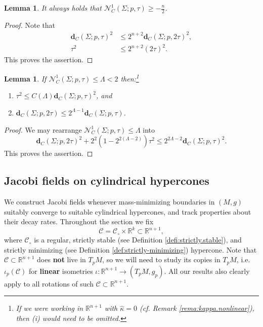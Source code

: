 \documentclass[11pt, letterpaper, reqno]{amsart}
\numberwithin{equation}{section}
\newtheorem{Lem}[Def]{Lemma}
\theoremstyle{remark}
\newcommand{\RR}{\mathbb{R}}
\newcommand{\cC}{\mathcal{C}}
\newcommand{\cN}{\mathcal{N}}
\newcommand{\mbfd}{\mathbf{d}}
\begin{document}
\begin{Lem}\label{Lem:freq-bd-below}
It always holds that $\cN^{1}_{C}(\Sigma;p,\tau) \geq - \frac n 2$. 
\end{Lem}
\begin{proof}
Note that
\begin{align*}
	\mbfd_C(\Sigma;p,\tau)^2 & \leq 2^{n+2} \mbfd_C(\Sigma;p,2\tau)^2, \\
	\tau^2 & \leq 2^{n+2}(2\tau)^2.
\end{align*}
This proves the assertion. 
\end{proof} 

\begin{Lem}\label{Lem:freq-lss-2-metric-dies}
If $\cN^{1}_C(\Sigma;p,\tau) \leq \Lambda < 2$ then:\footnote{If we were working in $\RR^{n+1}$ with $\hat \kappa = 0$ (cf. Remark \ref{rema:kappa.nonlinear}), then (i) would need to be omitted.}
\begin{enumerate}
	\item[(i)] $\tau^2 \leq C(\Lambda) \mbfd_C(\Sigma;p,\tau)^2$, and
	\item[(ii)] $\mbfd_C(\Sigma;p,2\tau) \leq 2^{\Lambda-1} \mbfd_C(\Sigma;p,\tau)$.
\end{enumerate}
\end{Lem}
\begin{proof}
We may rearrange $\cN^{1}_C(\Sigma;p,\tau) \leq \Lambda$ into
\[
\mbfd_C(\Sigma;p,2\tau)^2 + 2^2(1-2^{2(\Lambda-2)}) \tau^2 \leq 2^{2\Lambda-2} \mbfd_C(\Sigma;p,\tau)^2. 
\]
This proves the assertion. 
\end{proof}






\subsection{Jacobi fields on cylindrical hypercones} 

We construct Jacobi fields whenever mass-minimizing boundaries in $(M, g)$ suitably converge to suitable cylindrical hypercones, and track properties about their decay rates. Throughout the section we fix
\[ \cC = \cC_\circ \times \RR^k \subset \RR^{n+1}, \]
where $\cC_\circ$ is a regular, strictly stable (see Definition \ref{defi:strictly.stable}), and strictly minimizing (see Definition \ref{def:strictly-minimizing}) hypercone. Note that $\cC \subset \RR^{n+1}$ does \textbf{not} live in $T_p M$, so we will need to study its copies in $T_p M$, i.e. $\iota_p(\cC)$ for \textbf{linear} isometries $\iota : \RR^{n+1} \to (T_p M, g_p)$. All our results also clearly apply to all rotations of such $\cC \subset \RR^{n+1}$.
\end{document}
